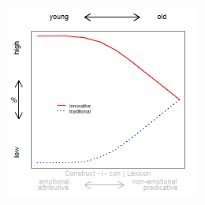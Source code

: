 \documentclass[12pt, table]{beamer}
\begin{document}
\begin{frame}
\begin{minipage}[t]{\linewidth}
\begin{minipage}{.45\linewidth}
\begin{tabular}{cccccccccc }
\end{tabular}
\end{minipage}
\hfill
\begin{minipage}{.45\linewidth}
\begin{figure}
\includegraphics[width=5cm]{images/LangChang14.png}
\end{figure}
\end{minipage}
\end{minipage}
\end{frame}
\end{document}
